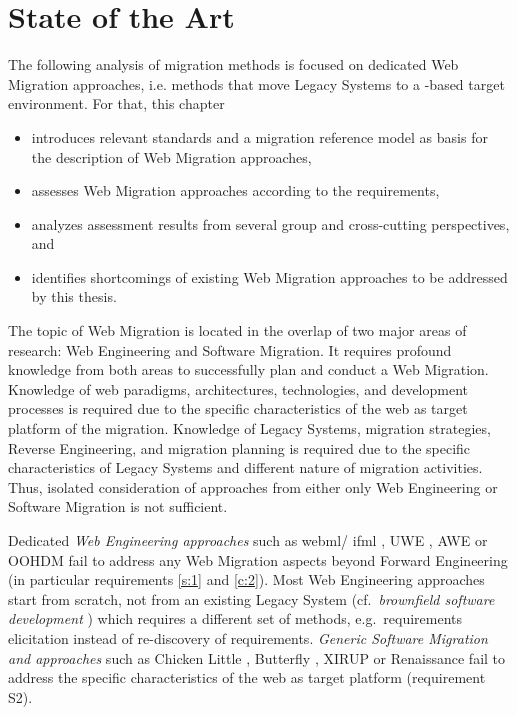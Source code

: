 \hypertarget{sec:sota}{%
\chapter{State of the Art}\label{sec:sota}}

The following analysis of migration methods is focused on dedicated \gls{Web Migration} approaches, i.e. methods that move \glspl{Legacy System} to a -based target environment.
For that, this chapter
\begin{itemize}
\item introduces relevant standards and a migration reference model as basis for the description of \gls{Web Migration} approaches,
\item assesses \gls{Web Migration} approaches according to the requirements,
\item analyzes assessment results from several group and cross-cutting perspectives, and
\item identifies shortcomings of existing \gls{Web Migration} approaches to be addressed by this thesis.
\end{itemize}

The topic of \gls{Web Migration} is located in the overlap of two major areas of research: \gls{Web Engineering} and \gls{Software Migration}.
It requires profound knowledge from both areas to successfully plan and conduct a \gls{Web Migration}.
Knowledge of \gls{web} paradigms, architectures, technologies, and development processes is required due to the specific characteristics of the \gls{web} as target platform of the migration.
Knowledge of \glspl{Legacy System}, migration strategies, \gls{Reverse Engineering}, and migration planning is required due to the specific characteristics of \glspl{Legacy System} and different nature of migration activities.
Thus, isolated consideration of approaches from either only \gls{Web Engineering} or \gls{Software Migration} is not sufficient.

Dedicated \emph{\gls{Web Engineering} approaches} such as \gls{webml}/ \gls{ifml} \autocite{OMG2015IFML}, UWE \autocite{Koch2008UWE}, AWE \autocite{McDonald2005AWE} or OOHDM \autocite{Schwabe1996OOHDM} fail to address any \gls{Web Migration} aspects beyond \gls{Forward Engineering} (in particular requirements \cref{s:1} and \cref{c:2}).
Most \gls{Web Engineering} approaches start from scratch, not from an existing \gls{Legacy System} (cf.~\emph{brownfield software development} \autocite{Hopkins2008Brownfield}) which requires a different set of methods, e.g.~requirements elicitation instead of re-discovery of requirements.
\emph{Generic \gls{Software Migration} and  approaches} such as Chicken Little \autocite{Brodie1995Migrating}, Butterfly \autocite{BingWu1997Butterfly}, XIRUP\autocite{Fuentes-Fernandez2012XIRUP} or Renaissance \autocite{Warren2002Renaissance} fail to address the specific characteristics of the \gls{web} as target platform (requirement S2).

